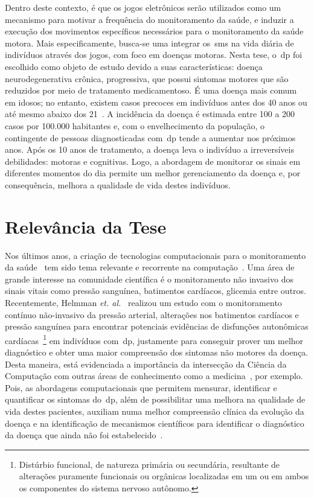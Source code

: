 Dentro deste contexto, é que os jogos eletrônicos serão utilizados como um mecanismo para motivar a frequência do monitoramento da saúde, e induzir a execução dos movimentos específicos necessários para o monitoramento da saúde motora. Mais especificamente, busca-se uma integrar os~\ac{sms} na vida diária de indivíduos através dos jogos, com foco em doenças motoras. Nesta tese, o~\ac{dp} foi escolhido como objeto de estudo devido a suas características: doença neurodegenerativa crônica, progressiva, que possui sintomas motores que são reduzidos por meio de tratamento medicamentoso. É uma doença mais comum em idosos; no entanto, existem casos precoces em indivíduos antes dos 40 anos ou até mesmo abaixo dos 21~\cite{menezes2003}. A incidência da doença é estimada entre 100 a 200 casos por 100.000 habitantes e, com o envelhecimento da população, o contingente de pessoas diagnosticadas com~\ac{dp} tende a aumentar nos próximos anos. Após os 10 anos de tratamento, a doença leva o indivíduo a irreversíveis debilidades: motoras e cognitivas. Logo, a abordagem de monitorar os sinais em diferentes momentos do dia permite um melhor gerenciamento da doença e, por consequência, melhora a qualidade de vida destes indivíduos.


\section{Relevância da Tese}\label{section:relevancia}
Nos últimos anos, a criação de tecnologias computacionais para o monitoramento da saúde~\cite{bardram2008} tem sido tema relevante e recorrente na computação~\cite{bradmonitor2015,compapproachparkinson2015,mazilu2015}. Uma área de grande interesse na comunidade científica é o monitoramento não invasivo dos sinais vitais como pressão sanguínea, batimentos cardíacos, glicemia entre outros. Recentemente, Helmman \textit{et. al.}~\cite{autonomparkin2015} realizou um estudo com o monitoramento contínuo não-invasivo da pressão arterial, alterações nos batimentos cardíacos e pressão sanguínea para encontrar potenciais evidências de disfunções autonômicas cardíacas~\footnote{Distúrbio funcional, de natureza primária ou secundária, resultante de alterações  puramente funcionais ou orgânicas localizadas em um  ou em ambos os componentes do sistema nervoso autônomo.} em indivíduos com~\ac{dp}, justamente para conseguir prover um melhor diagnóstico e obter uma maior compreensão dos sintomas não motores da doença. Desta maneira, está evidenciada a importância da intersecção da Ciência da Computação com outras áreas de conhecimento como a medicina~\cite{bardram2008}, por exemplo. Pois, as abordagens computacionais que permitem mensurar, identificar e quantificar os sintomas do~\ac{dp}, além de possibilitar uma melhora na qualidade de vida destes pacientes, auxiliam numa melhor compreensão clínica da evolução da doença e na identificação de mecanismos científicos para identificar o diagnóstico da doença que ainda não foi estabelecido~\cite{compapproachparkinson2015}.


